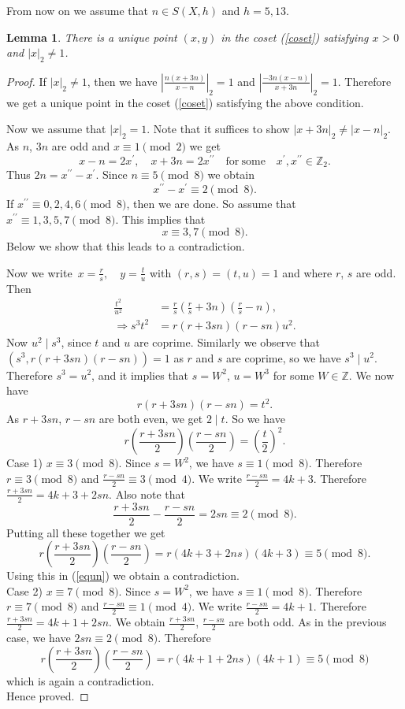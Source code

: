 \documentclass[11pt]{article}
\newcommand{\Z}{ {\mathbb{Z}} }
\newtheorem{lemma}[theorem]{Lemma}
\begin{document}
\noindent From now on we assume that $n\in S(X,h)$ and $h=5,13$.
\begin{lemma}\label{important lemma}
There is a unique point $(x,y)$ in the coset (\ref{coset}) satisfying $x>0$ and $|x|_{2}\neq 1$.    
\end{lemma}
\begin{proof}
If $|x|_{2}\neq 1$, then we have $|\frac{n(x+3n)}{x-n}|_{2}=1$ and $|\frac{-3n(x-n)}{x+3n}|_{2}=1$. Therefore we get a unique point in the coset (\ref{coset}) satisfying the above condition. 

\noindent Now we assume that $|x|_{2}=1$. Note that it suffices to show $|x+3n|_{2}\neq |x-n|_{2}$. As $n$, $3n$ are odd and $x\equiv 1\pmod{2}$ we get
$$x-n=2x^{\prime}, \quad x+3n=2x^{\prime \prime} \quad \mathrm{for\: some} \quad x^{\prime},x^{\prime \prime}\in \mathbb{Z}_{2}.$$ Thus $2n=x^{\prime \prime}-x^{\prime}$. Since $n\equiv 5\pmod{8}$ we obtain
$$x^{\prime \prime}-x^{\prime}\equiv 2\pmod{8}.$$
If $x^{\prime\prime}\equiv 0,2,4,6\pmod{8}$, then we are done. So  assume that $x^{\prime\prime}\equiv 1,3,5,7\pmod{8}$. This implies that $$x\equiv 3,7\pmod{8}.$$
Below we show that this leads to a contradiction.


\noindent Now we write $\, x=\frac{r}{s},\quad y=\frac{t}{u}$ with $(r,s)=(t,u)=1$ and where $r$, $s$ are odd. Then
\begin{align*}
\frac{t^{2}}{u^{2}}  & =\frac{r}{s}(\frac{r}{s}+3n)(\frac{r}{s}-n), \\ 
\Rightarrow s^{3}t^{2} &  =r(r+3sn)(r-sn)u^{2}.
\end{align*}
Now $u^{2}\mid s^{3}$, since $t$ and $u$ are coprime. Similarly we observe that $(s^{3}, r(r+3sn)(r-sn))=1$ as $r$ and $s$ are coprime, so we have $s^{3}\mid u^{2}$. Therefore $s^{3}=u^{2}$, and it implies that $s=W^{2}$, $u=W^{3}$ for some $W \in \Z$. We now have $$r(r+3sn)(r-sn)=t^{2}.$$ 
As $r+3sn$, $r-sn$ are both even, we get $2\mid t$. So we have
\begin{equation}\label{equn}
r\left(\frac{r+3sn}{2}\right)\left(\frac{r-sn}{2}\right)=\left(\frac{t}{2}\right)^{2}.    
\end{equation}
Case 1)  $x\equiv 3\pmod{8}$. Since $s=W^{2}$, we have $s\equiv 1\pmod{8}$. Therefore $r\equiv 3\pmod{8}$ and $\frac{r-sn}{2}\equiv 3\pmod{4}$. We write $\frac{r-sn}{2}=4k+3$. Therefore $\frac{r+3sn}{2}=4k+3+2sn$. Also note that
$$\frac{r+3sn}{2}-\frac{r-sn}{2}=2sn\equiv 2\pmod{8}.$$
Putting all these together we get
$$r\left(\frac{r+3sn}{2}\right)\left(\frac{r-sn}{2}\right)=r(4k+3+2ns)(4k+3)\equiv 5\pmod{8}.$$
Using this in (\ref{equn}) we obtain a contradiction.\\

\noindent Case 2)  $x\equiv 7\pmod{8}$. Since $s=W^{2}$, we have $s\equiv 1\pmod{8}$. Therefore $r\equiv 7\pmod{8}$ and $\frac{r-sn}{2}\equiv 1\pmod{4}$. We write  $\frac{r-sn}{2}=4k+1$. Therefore $\frac{r+3sn}{2}=4k+1+2sn$. We obtain $\frac{r+3sn}{2}$, $\frac{r-sn}{2}$ are both odd. As in the previous case, we have $2sn\equiv 2\pmod{8}$. Therefore
$$r\left(\frac{r+3sn}{2}\right)\left(\frac{r-sn}{2}\right)=r(4k+1+2ns)(4k+1)\equiv 5\pmod{8}$$
which is again a contradiction.\\
\noindent Hence proved.
\end{proof}
\end{document}
